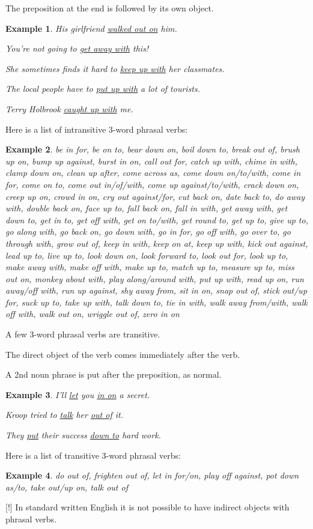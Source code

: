 \documentclass[oneside]{book}
\numberwithin{equation}{section}
\newtheorem{example}{Example}[section]
\begin{document}
The preposition at the end is followed by its own object.
\begin{example}
    His girlfriend \underline{walked out on} him.
    
    You're not going to \underline{get away with} this!
    
    She sometimes finds it hard to \underline{keep up with} her classmates.
    
    The local people have to \underline{put up with} a lot of tourists.
    
    Terry Holbrook \underline{caught up with} me.
\end{example}
%
\noindent{} Here is a list of intransitive 3-word phrasal verbs:
\begin{example}
    be in for, be on to, bear down on, boil down to, break out of, brush up on, bump up against, burst in on, call out for, catch up with, chime in with, clamp down on, clean up after, come across as, come down on/to/with, come in for, come on to, come out in/of/with, come up against/to/with, crack down on, creep up on, crowd in on, cry out against/for, cut back on, date back to, do away with, double back on, face up to, fall back on, fall in with, get away with, get down to, get in to, get off with, get on to/with, get round to, get up to, give up to, go along with, go back on, go down with, go in for, go off with, go over to, go through with, grow out of, keep in with, keep on at, keep up with, kick out against, lead up to, live up to, look down on, look forward to, look out for, look up to, make away with, make off with, make up to, match up to, measure up to, miss out on, monkey about with, play along/around with, put up with, read up on, run away/off with, run up against, shy away from, sit in on, snap out of, stick out/up for, suck up to, take up with, talk down to, tie in with, walk away from/with, walk off with, walk out on, wriggle out of, zero in on
\end{example}
%
\noindent{} A few 3-word phrasal verbs are transitive.

The direct object of the verb comes immediately after the verb.

A 2nd noun phrase is put after the preposition, as normal.
\begin{example}
    I'll \underline{let} you \underline{in on} a secret.
    
    Kroop tried to \underline{talk} her \underline{out of} it.
    
    They \underline{put} their success \underline{down to} hard work.
\end{example}
Here is a list of transitive 3-word phrasal verbs:
\begin{example}
    do out of, frighten out of, let in for/on, play off against, pot down as/to, take out/up on, talk out of
\end{example}
%
\noindent{} [!] In standard written English it is not possible to have indirect objects with phrasal verbs.
\end{document}

